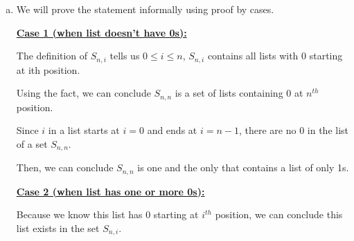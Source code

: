 \documentclass[12pt]{article}
\begin{document}
\begin{enumerate}[a.]
\begin{mdframed}
    \end{mdframed}

    \item

    We will prove the statement informally using proof by cases.

    \bigskip

    \underline{\textbf{Case 1 (when list doesn’t have 0s):}}

    \bigskip

    The definition of $S_{n,i}$ tells us $0 \leq i \leq n$, $S_{n,i}$ contains
    all lists with 0 starting at ith position.

    \bigskip

    Using the fact, we can conclude $S_{n,n}$ is a set of lists containing 0 at $n^{th}$
    position.

    \bigskip

    Since $i$ in a list starts at $i = 0$ and ends at $i = n-1$, there are no 0
    in the list of a set $S_{n,n}$.

    \bigskip

    Then, we can conclude $S_{n,n}$ is one and the only that contains a list of only 1s.

    \bigskip

    \underline{\textbf{Case 2 (when list has one or more 0s):}}

    \bigskip

    Because we know this list has 0 starting at $i^{th}$ position, we can conclude
    this list exists in the set $S_{n,i}$.


\end{enumerate}
\end{document}
